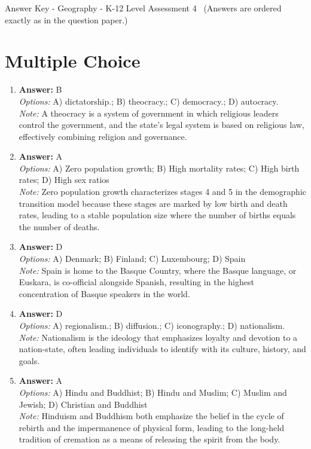 \documentclass[12pt]{article}
\begin{document}
\begin{center}
Answer Key - Geography - K-12 Level Assessment 4 \
\small (Answers are ordered exactly as in the question paper.)
\end{center}

\section*{Multiple Choice}
\begin{enumerate}[label=\arabic*.]
\item \textbf{Answer:} B
\\ \textit{Options:} A) dictatorship.; B) theocracy.; C) democracy.; D) autocracy.
\\ \textit{Note:} A theocracy is a system of government in which religious leaders control the government, and the state's legal system is based on religious law, effectively combining religion and governance.
\item \textbf{Answer:} A
\\ \textit{Options:} A) Zero population growth; B) High mortality rates; C) High birth rates; D) High sex ratios
\\ \textit{Note:} Zero population growth characterizes stages 4 and 5 in the demographic transition model because these stages are marked by low birth and death rates, leading to a stable population size where the number of births equals the number of deaths.
\item \textbf{Answer:} D
\\ \textit{Options:} A) Denmark; B) Finland; C) Luxembourg; D) Spain
\\ \textit{Note:} Spain is home to the Basque Country, where the Basque language, or Euskara, is co-official alongside Spanish, resulting in the highest concentration of Basque speakers in the world.
\item \textbf{Answer:} D
\\ \textit{Options:} A) regionalism.; B) diffusion.; C) iconography.; D) nationalism.
\\ \textit{Note:} Nationalism is the ideology that emphasizes loyalty and devotion to a nation-state, often leading individuals to identify with its culture, history, and goals.
\item \textbf{Answer:} A
\\ \textit{Options:} A) Hindu and Buddhist; B) Hindu and Muslim; C) Muslim and Jewish; D) Christian and Buddhist
\\ \textit{Note:} Hinduism and Buddhism both emphasize the belief in the cycle of rebirth and the impermanence of physical form, leading to the long-held tradition of cremation as a means of releasing the spirit from the body.
\end{enumerate}
\end{document}
